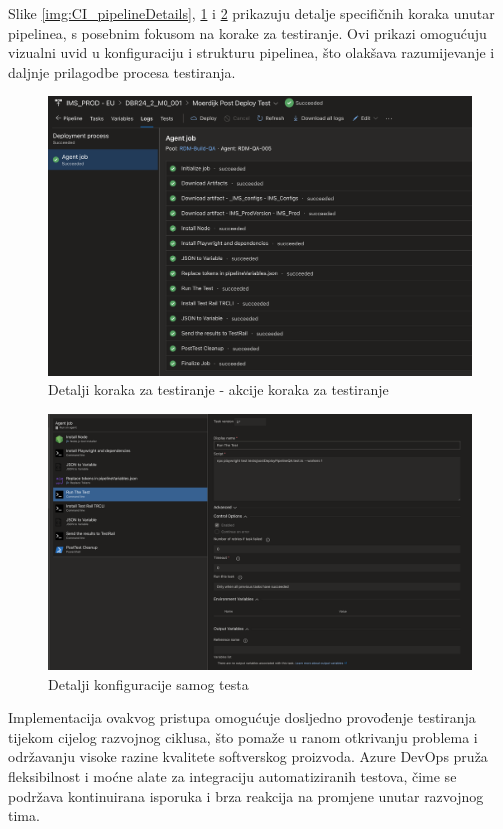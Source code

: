 Slike \ref{img:CI_pipelineDetails}, \ref{img:CI_pipeline} i \ref{img:CI_testConfig} prikazuju detalje specifičnih koraka unutar pipelinea, s posebnim fokusom na korake za testiranje. Ovi prikazi omogućuju vizualni uvid u konfiguraciju i strukturu pipelinea, što olakšava razumijevanje i daljnje prilagodbe procesa testiranja.

\begin{figure}[!h]\begin{center}
  \includegraphics[width=1\textwidth]{"img/CI_pipeline"}
  \caption{Detalji koraka za testiranje - akcije koraka za testiranje}\label{img:CI_pipeline}
\end{center}\end{figure}

\begin{figure}[!h]\begin{center}
  \includegraphics[width=1\textwidth]{"img/CI_testConfig"}
  \caption{Detalji konfiguracije samog testa}\label{img:CI_testConfig}
\end{center}\end{figure}

Implementacija ovakvog pristupa omogućuje dosljedno provođenje testiranja tijekom cijelog razvojnog ciklusa, što pomaže u ranom otkrivanju problema i održavanju visoke razine kvalitete softverskog proizvoda.
Azure DevOps pruža fleksibilnost i moćne alate za integraciju automatiziranih testova, čime se podržava kontinuirana isporuka i brza reakcija na promjene unutar razvojnog tima.